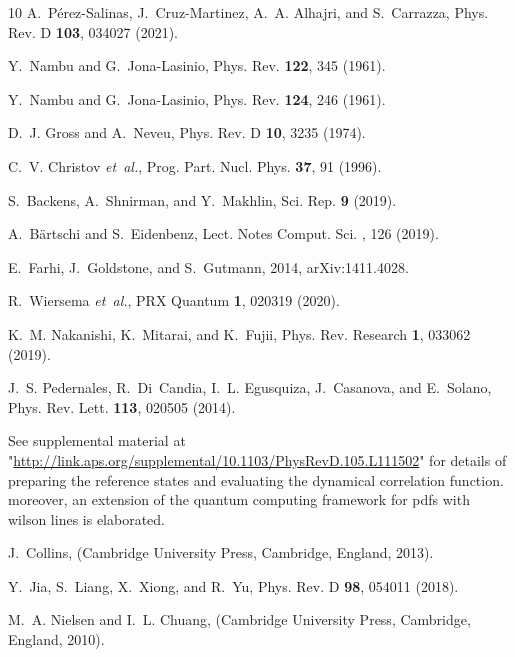 \documentclass[aps,prl,twocolumn,superscriptaddress,notitlepage,nofootinbib]{revtex4-1}
\begin{document}
\begin{thebibliography}{10}
A.~P\'erez-Salinas, J.~Cruz-Martinez, A.~A. Alhajri, and S.~Carrazza,
\newblock Phys. Rev. D {\bf 103}, 034027 (2021).

Y.~Nambu and G.~Jona-Lasinio,
\newblock Phys. Rev. {\bf 122}, 345 (1961).

Y.~Nambu and G.~Jona-Lasinio,
\newblock Phys. Rev. {\bf 124}, 246 (1961).

D.~J. Gross and A.~Neveu,
\newblock Phys. Rev. D {\bf 10}, 3235 (1974).

C.~V. Christov {\em et~al.},
\newblock Prog. Part. Nucl. Phys. {\bf 37}, 91 (1996).

S.~Backens, A.~Shnirman, and Y.~Makhlin,
\newblock Sci. Rep. {\bf 9} (2019).

A.~Bärtschi and S.~Eidenbenz,
\newblock Lect. Notes Comput. Sci. , 126 (2019).

E.~Farhi, J.~Goldstone, and S.~Gutmann, 2014, arXiv:1411.4028.

R.~Wiersema {\em et~al.},
\newblock PRX Quantum {\bf 1}, 020319 (2020).

K.~M. Nakanishi, K.~Mitarai, and K.~Fujii,
\newblock Phys. Rev. Research {\bf 1}, 033062 (2019).

J.~S. Pedernales, R.~Di~Candia, I.~L. Egusquiza, J.~Casanova, and E.~Solano,
\newblock Phys. Rev. Lett. {\bf 113}, 020505 (2014).

See supplemental material at
  "\url{http://link.aps.org/supplemental/10.1103/PhysRevD.105.L111502}" for
  details of preparing the reference states and evaluating the dynamical
  correlation function. moreover, an extension of the quantum computing
  framework for pdfs with wilson lines is elaborated.

J.~Collins,
 (Cambridge University Press,
  Cambridge, England, 2013).

Y.~Jia, S.~Liang, X.~Xiong, and R.~Yu,
\newblock Phys. Rev. D {\bf 98}, 054011 (2018).

M.~A. Nielsen and I.~L. Chuang,
 (Cambridge University Press, Cambridge, England, 2010).


\end{thebibliography}
\end{document}

